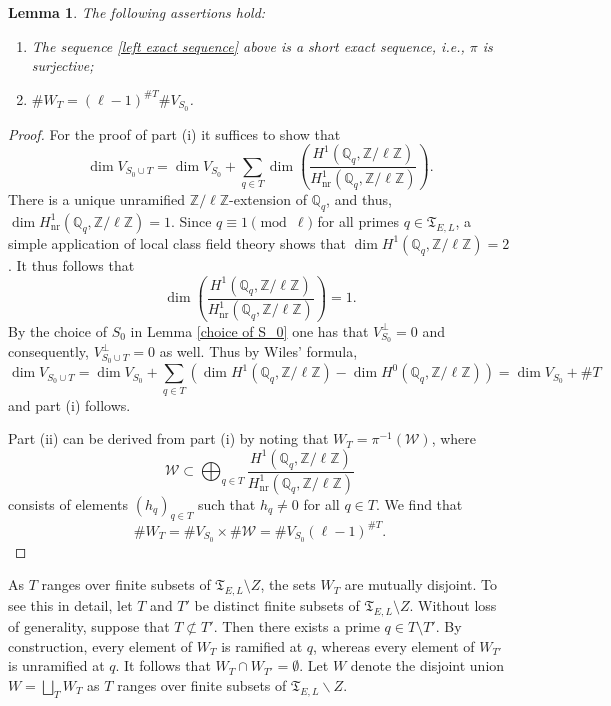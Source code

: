 \documentclass[11pt,reqno]{amsart}
\newtheorem{lemma}[theorem]{Lemma}
\newcommand{\Z}{\mathbb{Z}}
\newcommand{\Q}{\mathbb{Q}}
\newcommand{\op}[1]{\operatorname{#1}}
\numberwithin{equation}{section}
\begin{document}
\begin{lemma}
    The following assertions hold:
    \begin{enumerate}
        \item[(i)] The sequence \eqref{left exact sequence} above is a short exact sequence, i.e., $\pi$ is surjective;
        \item[(ii)] $\# W_T=(\ell-1)^{\# T}\#V_{S_0}$.
    \end{enumerate}
\end{lemma}
\begin{proof}
    For the proof of part (i) it suffices to show that 
    \[\dim V_{S_0\cup T}=\dim V_{S_0}+\sum_{q\in T} \dim \left(\frac{H^1(\Q_q, \Z/\ell \Z)}{H^1_{\op{nr}}(\Q_q, \Z/\ell \Z)}\right).\]
    There is a unique unramified $\Z/\ell\Z$-extension of $\Q_q$, and thus, $\dim H^1_{\op{nr}}(\Q_q, \Z/\ell \Z)=1$. Since $q\equiv 1\pmod{\ell}$ for all primes $q\in \mathfrak{T}_{E,L}$, a simple application of local class field theory shows that $\dim H^1(\Q_q, \Z/\ell \Z)=2$. It thus follows that\[\dim \left(\frac{H^1(\Q_q, \Z/\ell \Z)}{H^1_{\op{nr}}(\Q_q, \Z/\ell \Z)}\right)=1.\]
    By the choice of $S_0$ in Lemma \ref{choice of S_0} one has that $V_{S_0}^\perp=0$ and consequently, $V_{S_0\cup T}^\perp=0$ as well. Thus by Wiles' formula, 
    \[\dim V_{S_0\cup T}=\dim V_{S_0} +\sum_{q\in T} (\dim H^1(\Q_q, \Z/\ell\Z)-\dim H^0(\Q_q, \Z/\ell\Z))=\dim V_{S_0}+\#T\] and part (i) follows.
    \par Part (ii) can be derived from part (i) by noting that $W_T=\pi^{-1}(\mathcal{W})$, where \[\mathcal{W}\subset \bigoplus_{q\in T} \frac{H^1(\Q_q, \Z/\ell \Z)}{H^1_{\op{nr}}(\Q_q, \Z/\ell \Z)}\] consists of elements $(h_q)_{q\in T}$ such that $h_q\neq 0$ for all $q\in T$. We find that 
    \[\#W_T=\#V_{S_0}\times \# \mathcal{W}=\#V_{S_0}(\ell-1)^{\# T}.\]
\end{proof}
As \( T \) ranges over finite subsets of \( \mathfrak{T}_{E,L} \setminus Z \), the sets \( W_T \) are mutually disjoint. To see this in detail, let \( T \) and \( T' \) be distinct finite subsets of \( \mathfrak{T}_{E,L} \setminus Z \). Without loss of generality, suppose that \( T \not\subset T' \). Then there exists a prime \( q \in T \setminus T' \). By construction, every element of \( W_T \) is ramified at \( q \), whereas every element of \( W_{T'} \) is unramified at \( q \). It follows that \( W_T \cap W_{T'} = \emptyset \). Let \( W \) denote the disjoint union \( W = \bigsqcup_T W_T \) as $T$ ranges over finite subsets of $\mathfrak{T}_{E,L}\backslash Z$.
\end{document}
